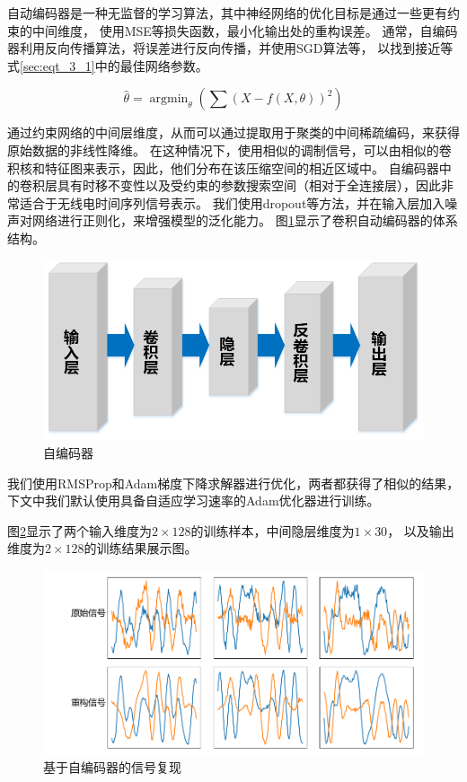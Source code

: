 自动编码器是一种无监督的学习算法，其中神经网络的优化目标是通过一些更有约束的中间维度，
使用MSE等损失函数，最小化输出处的重构误差。
通常，自编码器利用反向传播算法，将误差进行反向传播，并使用SGD算法等，
以找到接近等式\eqref{sec:eqt_3_1}中的最佳网络参数。

\begin{equation}\label{sec:eqt_3_1}
	\hat{\theta} = \mathop{\arg\min}_{\theta}(\sum(X − f (X,\theta))^2)
\end{equation}

通过约束网络的中间层维度，从而可以通过提取用于聚类的中间稀疏编码，来获得原始数据的非线性降维。
在这种情况下，使用相似的调制信号，可以由相似的卷积核和特征图来表示，因此，他们分布在该压缩空间的相近区域中。
自编码器中的卷积层具有时移不变性以及受约束的参数搜索空间（相对于全连接层），因此非常适合于无线电时间序列信号表示。
我们使用dropout等方法，并在输入层加入噪声对网络进行正则化，来增强模型的泛化能力。
图\ref{sec:fig_3_4}显示了卷积自动编码器的体系结构。

\begin{figure}[!h]
	\centering
	\includegraphics[scale=0.6]{figures/chapter_3/fig_3_4}
	\caption{自编码器}	\label{sec:fig_3_4}
\end{figure}

我们使用RMSProp和Adam梯度下降求解器进行优化，两者都获得了相似的结果，
下文中我们默认使用具备自适应学习速率的Adam优化器进行训练。\par

图\ref{sec:fig_3_5}显示了两个输入维度为$2 \times 128$的训练样本，中间隐层维度为$1 \times 30$，
以及输出维度为$2 \times 128$的训练结果展示图。\par
\begin{figure}[!h]
	\centering
	\includegraphics[scale=0.6]{figures/chapter_3/fig_3_5}
	\caption{基于自编码器的信号复现}	\label{sec:fig_3_5}
\end{figure} 

